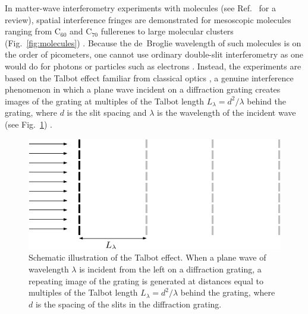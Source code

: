 \documentclass[3p,sort&compress,12pt]{elsarticle}
\begin{document}
In matter-wave interferometry experiments with molecules (see Ref.~\cite{Hornberger:2012:ii} for a review), spatial interference fringes are demonstrated for mesoscopic molecules ranging from C$_{60}$ and C$_{70}$ fullerenes \cite{Arndt:1999:rc} to large molecular clusters (Fig.~\ref{fig:molecules}) \cite{Gerlich:2011:aa,Eibenberger:2013:az}. Because the de~Broglie wavelength of such molecules is on the order of picometers, one cannot use ordinary double-slit interferometry as one would do for photons or particles such as electrons \cite{Jonsson:1961:rz,Jonsson:1974:rz,Tonomura:1989:as}. Instead, the experiments are based on the Talbot effect familiar from classical optics \cite{Mansuripur:2009:zz}, a genuine interference phenomenon in which a plane wave incident on a diffraction grating creates images of the grating at multiples of the Talbot length $L_\lambda = d^2/\lambda$ behind the grating, where $d$ is the slit spacing and $\lambda$ is the wavelength of the incident wave (see Fig.~\ref{fig:tbeff}) \cite{Mansuripur:2009:zz,Hackermuller:2003:uu}. 

\begin{figure}
\centering
\includegraphics[scale=1]{tbeff.pdf}
\caption{Schematic illustration of the Talbot effect. When a plane wave of wavelength $\lambda$ is incident from the left on a diffraction grating, a repeating image of the grating is generated at distances equal to multiples of the Talbot length $L_\lambda = d^2/\lambda$ behind the grating, where $d$ is the spacing of the slits in the diffraction grating.}
\label{fig:tbeff}
\end{figure}
\end{document}
